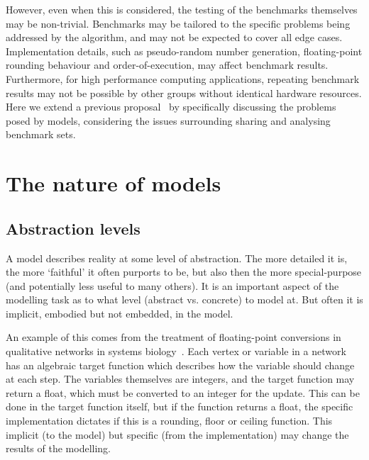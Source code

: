 \documentclass[conference]{IEEEtran}
\begin{document}
However, even when this is considered, the testing of the benchmarks
themselves may be non-trivial. Benchmarks may be tailored to the
specific problems being addressed by the algorithm, and may not be
expected to cover all edge cases. Implementation details, such as
pseudo-random number generation, floating-point rounding behaviour and
order-of-execution, may affect benchmark results. Furthermore, for
high performance computing applications, repeating benchmark results
may not be possible by other groups without identical hardware
resources. Here we extend a previous
proposal~\cite{crick-et-al_wssspe2} by specifically discussing the
problems posed by models, considering the issues surrounding sharing
and analysing benchmark sets.


\section{The nature of models}

\subsection{Abstraction levels} 

A model describes reality at some level of abstraction. The more
detailed it is, the more `faithful' it often purports to be, but also
then the more special-purpose (and potentially less useful to many others). It is
an important aspect of the modelling task as to what level (abstract
vs. concrete) to model at. But often it is implicit, embodied but not
embedded, in the model.

An example of this comes from the treatment of floating-point
conversions in qualitative networks in systems
biology~\cite{Schaub2007}. Each vertex or variable in a network has an
algebraic target function which describes how the variable should
change at each step. The variables themselves are integers, and the
target function may return a float, which must be converted to an
integer for the update. This can be done in the target function
itself, but if the function returns a float, the specific
implementation dictates if this is a rounding, floor or ceiling
function. This implicit (to the model) but specific (from the
implementation) may change the results of the modelling.
\end{document}
